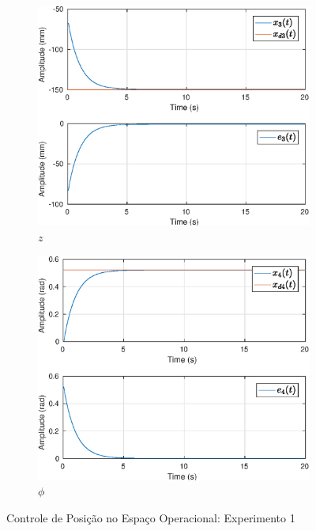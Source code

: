 \begin{figure}[H]
\begin{subfigure}{.5\textwidth}
  \centering
  \includegraphics[width=\linewidth]{./img/position1/x3.eps}
  \caption{$z$}
  \label{fig:oper_space_exp1_x3}
\end{subfigure}%
\begin{subfigure}{.5\textwidth}
  \centering
  \includegraphics[width=\linewidth]{./img/position1/x4.eps}
  \caption{$\phi$}
  \label{fig:oper_space_exp1_x4}
\end{subfigure}
\caption{Controle de Posição no Espaço Operacional: Experimento 1}
\label{fig:oper_space_exp1}
\end{figure}

